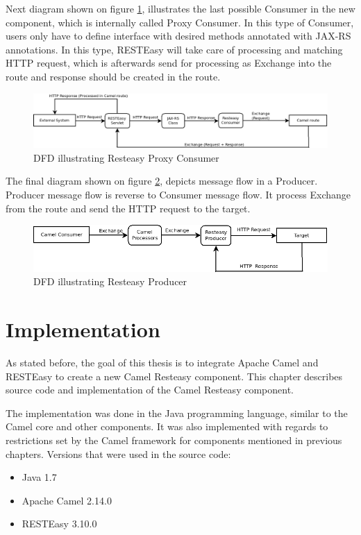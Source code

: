 \documentclass[12pt,final,oneside]{fithesis2}
\begin{document}
Next diagram shown on figure \ref{dfd-proxy}, illustrates the last possible Consumer in the new component, which is internally called Proxy Consumer. In this type of Consumer, users only have to define interface with desired methods annotated with JAX-RS annotations. In this type, RESTEasy will take care of processing and matching HTTP request, which is afterwards send for processing as Exchange into the route and response should be created in the route.  

\begin{figure}[h]
\advance\leftskip-2cm
\includegraphics[width=1.3\linewidth]{diagrams/proxy.png}
\caption{DFD illustrating Resteasy Proxy Consumer}
\label{dfd-proxy}
\end{figure}

The final diagram shown on figure \ref{dfd-prod}, depicts message flow in a Producer. Producer message flow is reverse to Consumer message flow. It process Exchange from the route and send the HTTP request to the target. 

\begin{figure}[h]
\advance\leftskip-1cm
\includegraphics[width=1.1\linewidth]{diagrams/producer.png}
\caption{DFD illustrating Resteasy Producer}
\label{dfd-prod}
\end{figure}


\chapter{Implementation}\label{impl}
As stated before, the goal of this thesis is to integrate Apache Camel and RESTEasy to create a new Camel Resteasy component. This chapter describes source code and implementation of the Camel Resteasy component. 

The implementation was done in the Java programming language, similar to the Camel core and other components. It was also implemented with regards to restrictions set by the Camel framework for components mentioned in previous chapters. Versions that were used in the source code:
\begin{itemize}
\item
Java 1.7

\item
Apache Camel 2.14.0

\item
RESTEasy 3.10.0
\end{itemize}
\end{document}
